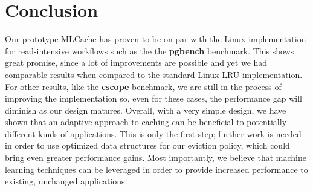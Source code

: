 \section{Conclusion}

Our prototype MLCache has proven to be on par with the Linux implementation for
read-intensive workflows such as the the \textbf{pgbench} benchmark. This shows
great promise, since a lot of improvements are possible and yet we had
comparable results when compared to the standard Linux LRU implementation. For
other results, like the \textbf{cscope} benchmark, we are still in the process
of improving the implementation so, even for these cases, the performance gap
will diminish as our design matures. Overall, with a very simple design, we
have shown that an adaptive approach to caching can be beneficial to
potentially different kinds of applications. This is only the first step;
further work is needed in order to use optimized data structures for our
eviction policy, which could bring even greater performance gains.
Most importantly, we believe that machine learning techniques
can be leveraged in order to provide increased performance to existing,
unchanged applications.
